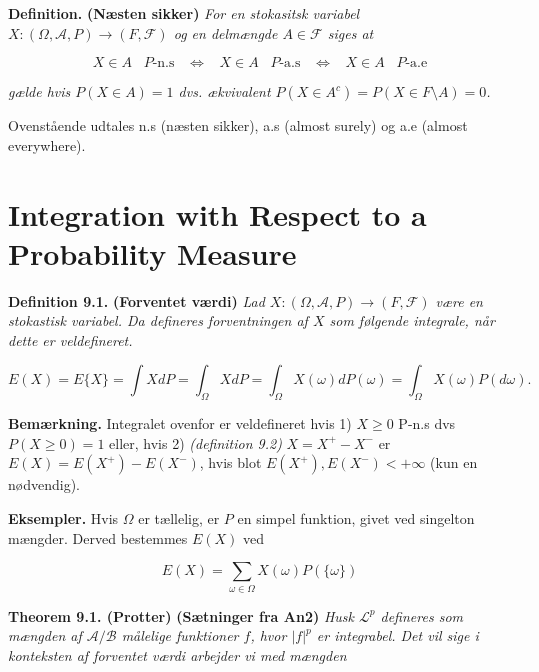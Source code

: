 \documentclass[
]{book}
\begin{document}
\textbf{Definition.} \textbf{(Næsten sikker)} \emph{For en stokasitsk variabel \(X:(\Omega,\mathcal{A},P) \to (F,\mathcal{F})\) og en delmængde \(A\in \mathcal{F}\) siges at}

\[
X\in A\hspace{10pt} P\text{-n.s}\hspace{10pt}\Leftrightarrow\hspace{10pt} X\in A\hspace{10pt} P\text{-a.s}\hspace{10pt}\Leftrightarrow\hspace{10pt} X\in A\hspace{10pt} P\text{-a.e}
\]

\emph{gælde hvis \(P(X\in A)=1\) dvs. ækvivalent \(P(X\in A^c)=P(X\in F\setminus A)=0\).}

Ovenstående udtales n.s (næsten sikker), a.s (almost surely) og a.e (almost everywhere).

\hypertarget{integration-with-respect-to-a-probability-measure}{%
\section{Integration with Respect to a Probability Measure}\label{integration-with-respect-to-a-probability-measure}}

\textbf{Definition 9.1.} \textbf{(Forventet værdi)} \emph{Lad \(X : (\Omega, \mathcal{A}, P) \to (F,\mathcal{F})\) være en stokastisk variabel. Da defineres forventningen af \(X\) som følgende integrale, når dette er veldefineret.}

\[
E(X)=E\{X\}=\int X dP=\int_\Omega X dP=\int_\Omega X(\omega)dP(\omega)=\int_\Omega X(\omega)P(d\omega).
\]

\textbf{Bemærkning.} Integralet ovenfor er veldefineret hvis 1) \(X\ge 0\) P-n.s dvs \(P(X\ge 0)=1\) eller, hvis 2) \emph{(definition 9.2)} \(X=X^+-X^-\) er \(E(X)=E(X^+)-E(X^-)\), hvis blot \(E(X^+),E(X^-)<+\infty\) (kun en nødvendig).

\textbf{Eksempler.} Hvis \(\Omega\) er tællelig, er \(P\) en simpel funktion, givet ved singelton mængder. Derved bestemmes \(E(X)\) ved

\[
E(X)=\sum_{\omega\in\Omega} X(\omega)P(\{\omega\})
\]

\textbf{Theorem 9.1. (Protter)} \textbf{(Sætninger fra An2)} \emph{Husk \(\mathcal{L}^p\) defineres som mængden af \(\mathcal{A}/\mathcal{B}\) målelige funktioner \(f\), hvor \(\vert f\vert ^p\) er integrabel. Det vil sige i konteksten af forventet værdi arbejder vi med mængden}
\end{document}
